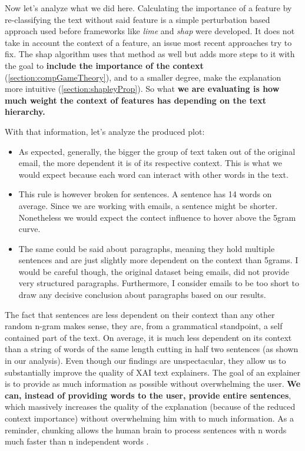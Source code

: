 Now let's analyze what we did here. Calculating the importance of a feature by re-classifying the text without said feature is a simple perturbation based approach used before frameworks like \textit{lime} and \textit{shap} were developed. It does not take in account the context of a feature, an issue most recent approaches try to fix. The shap algorithm uses that method as well but adds more steps to it with the goal to \textbf{include the importance of the context} (\autoref{section:compGameTheory}), and to a smaller degree, make the explanation more intuitive (\autoref{section:shapleyProp}). So what \textbf{we are evaluating is how much weight the context of features has depending on the text hierarchy.}
\vspace{1cm}

With that information, let's analyze the produced plot:
\begin{itemize}
    \item As expected, generally, the bigger the group of text taken out of the original email, the more dependent it is of its respective context. This is what we would expect because each word can interact with other words in the text.
    \item This rule is however broken for sentences. A sentence has 14 words on average. Since we are working with emails, a sentence might be shorter. Nonetheless we would expect the contect influence to hover above the 5gram curve.
    \item The same could be said about paragraphs, meaning they hold multiple sentences and are just slightly more dependent on the context than 5grams. I would be careful though, the original dataset being emails, did not provide very structured paragraphs. Furthermore, I consider emails to be too short to draw any decisive conclusion about paragraphs based on our results.
\end{itemize}



The fact that sentences are less dependent on their context than any other random n-gram makes sense, they are, from a grammatical standpoint, a self contained part of the text. On average, it is much less dependent on its context than a string of words of the same length cutting in half two sentences (as shown in our analysis). Even though our findings are unspectacular, they allow us to substantially improve the quality of XAI text explainers. The goal of an explainer is to provide as much information as possible without overwhelming the user. \textbf{We can, instead of providing words to the user, provide entire sentences}, which massively increases the quality of the explanation (because of the reduced context importance) without overwhelming him with to much information. As a reminder, chunking allows the human brain to process sentences with n words much faster than n independent words \cite{ChunkingWikipedia}.

